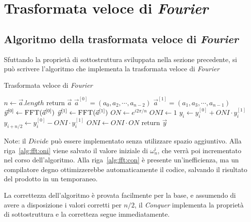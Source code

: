 \section{Trasformata veloce di \textit{Fourier}}

\subsection{Algoritmo della trasformata veloce di \textit{Fourier}}

Sfuttando la proprietà di sottostruttura sviluppata nella sezione precedente, si può scrivere l'algoritmo che implementa la trasformata veloce di \textit{Fourier}
\begin{algorithm}[H]
\caption{Trasformata veloce di \textit{Fourier}}\label{alg:fft}
\begin{algorithmic}[1]
        \State $n \gets \vec{a}.length$
            \State return $\vec{a}$
        \EndIf
        \State $\vec{a}^{[0]}=\left( a_0, a_2,\cdots, a _{n-2} \right)$
        \label{alg:fft:a0}
        \State $\vec{a}^{[1]}=\left( a_1, a_3,\cdots, a _{n-1} \right)$
        \State $\vec{y}^{[0]} \gets \Call{FFT}{\vec{a}^{[0]}}$
        \State $\vec{y}^{[1]} \gets \Call{FFT}{\vec{a}^{[1]}}$
        \State $ON \gets e^{i 2 \pi/n}$   
        \State $ONI \gets 1$   
        \label{alg:fft:oni}
            \State $y_{i} \gets y_{i}^{[0]} + ONI \cdot y_i^{[1]}$
            \label{alg:fft:con}
            \State $y_{i+n/2} \gets y_{i}^{[0]} - ONI \cdot y_i^{[1]}$
            \State $ONI \gets ONI \cdot ON$
        \EndFor
        \State return $\vec{y}$
    \EndProcedure
\end{algorithmic}
\end{algorithm}

Note: il $Divide$ può essere implementato senza utilizzare spazio aggiuntivo. Alla riga~\ref{alg:fft:oni} viene salvato il valore iniziale di $\omega_n^i$, che verrà poi incrementato nel corso dell'algoritmo. Alla riga~\ref{alg:fft:con} è presente un'inefficienza, ma un compilatore degno ottimizzerebbe automaticamente il codice, salvando il risultato del prodotto in un temporaneo.

La correttezza dell'algoritmo è provata facilmente per la base, e assumendo di avere a disposizione i valori corretti per $n/2$, il \textit{Conquer} implementa la proprietà di sottostruttura e la corretteza segue immediatamente.

